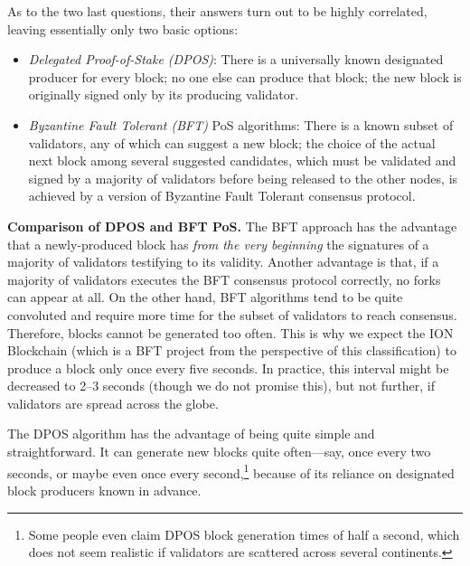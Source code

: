 \documentclass[12pt,oneside]{article}
\def\makepoint#1{\medbreak\noindent{\bf #1.\ }}
\def\nxsubpoint{\refstepcounter{subsubsection}%
  \smallbreak\makepoint{\thesubsubsection}}
\def\embt(#1.){\textbf{#1.}}
\begin{document}
As to the two last questions, their answers turn out to be highly
correlated, leaving essentially only two basic options:
\begin{itemize}
\item {\em Delegated Proof-of-Stake (DPOS)}: There is a universally
  known designated producer for every block; no one else can produce
  that block; the new block is originally signed only by its producing
  validator.
\item {\em Byzantine Fault Tolerant (BFT)} PoS algorithms: There is a
  known subset of validators, any of which can suggest a new block;
  the choice of the actual next block among several suggested
  candidates, which must be validated and signed by a majority of
  validators before being released to the other nodes, is achieved by
  a version of Byzantine Fault Tolerant consensus protocol.
\end{itemize}

\nxsubpoint\label{sp:dpos.bft.compare} \embt(Comparison of DPOS and
BFT PoS.)  The BFT approach has the advantage that a newly-produced
block has {\em from the very beginning\/} the signatures of a majority
of validators testifying to its validity. Another advantage is that,
if a majority of validators executes the BFT consensus protocol
correctly, no forks can appear at all. On the other hand, BFT
algorithms tend to be quite convoluted and require more time for the
subset of validators to reach consensus. Therefore, blocks cannot be
generated too often. This is why we expect the ION Blockchain (which
is a BFT project from the perspective of this classification) to
produce a block only once every five seconds. In practice, this
interval might be decreased to 2--3 seconds (though we do not promise
this), but not further, if validators are spread across the globe.

The DPOS algorithm has the advantage of being quite simple and
straightforward. It can generate new blocks quite often---say, once
every two seconds, or maybe even once every second,\footnote{Some
  people even claim DPOS block generation times of half a second,
  which does not seem realistic if validators are scattered across
  several continents.} because of its reliance on designated block
producers known in advance.
\end{document}
